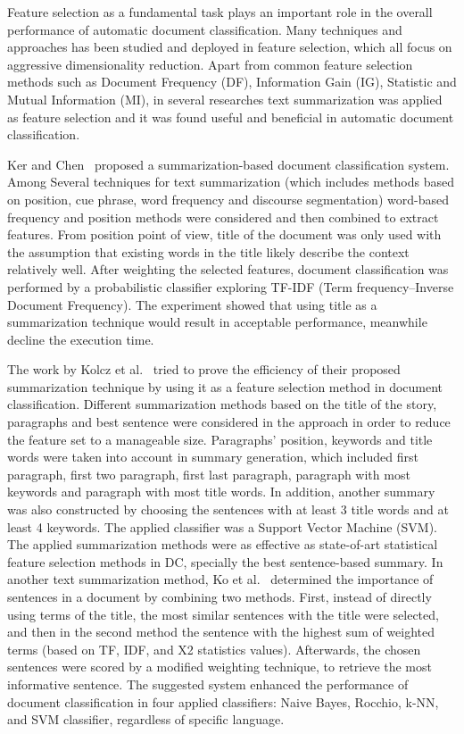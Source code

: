 \documentclass{sigchi}
\begin{document}
Feature selection as a fundamental task plays an important role in the overall performance of automatic document classification. 
Many techniques and approaches has been studied and deployed in feature selection, which all focus on aggressive dimensionality reduction. 
Apart from common feature selection methods such as Document Frequency (DF), Information Gain (IG), Statistic and Mutual Information (MI), in several researches text summarization was applied as feature selection and it was found useful and beneficial in automatic document classification.

Ker and Chen~\cite{Ker:2000:TCB:1117755.1117766} proposed a summarization-based document classification system. 
Among Several techniques for text summarization (which includes methods based on position, cue phrase, word frequency and discourse segmentation) word-based frequency and position methods were considered and then combined to extract features. 
From position point of view, title of the document was only used with the assumption that existing words in the title likely describe the context relatively well.
After weighting the selected features, document classification was performed by a probabilistic classifier exploring TF-IDF (Term frequency–Inverse Document Frequency). 
The experiment showed that using title as a summarization technique would result in acceptable performance, meanwhile decline the execution time.

The work by Kolcz et al.~\cite{Kolcz:2001:SFS:502585.502647} tried to prove the efficiency of their proposed summarization technique by using it as a feature selection method in document classification. 
Different summarization methods based on the title of the story, paragraphs and best sentence were considered in the approach in order to reduce the feature set to a manageable size. Paragraphs' position, keywords and title words were taken into account in summary generation, which included first paragraph, first two paragraph, first last paragraph, paragraph with most keywords and paragraph with most title words. In addition, another summary was also constructed by choosing the sentences with at least 3 title words and at least 4 keywords. 
The applied classifier was a Support Vector Machine (SVM). 
The applied summarization methods were as effective as state-of-art statistical feature selection methods in DC, specially the best sentence-based summary.
In another text summarization method, Ko et al.~\cite{Ko:2004:ITC:975966.975971} determined the importance of sentences in a document by combining two methods. 
First, instead of directly using terms of the title, the most similar sentences with the title were selected, and then in the second method the sentence with the highest sum of weighted terms (based on TF, IDF, and X2 statistics values). 
Afterwards, the chosen sentences were scored by a modified weighting technique, to retrieve the most informative sentence. 
The suggested system enhanced the performance of document classification in four applied classifiers: Naive Bayes, Rocchio, k-NN, and SVM classifier, regardless of specific language.
\end{document}
